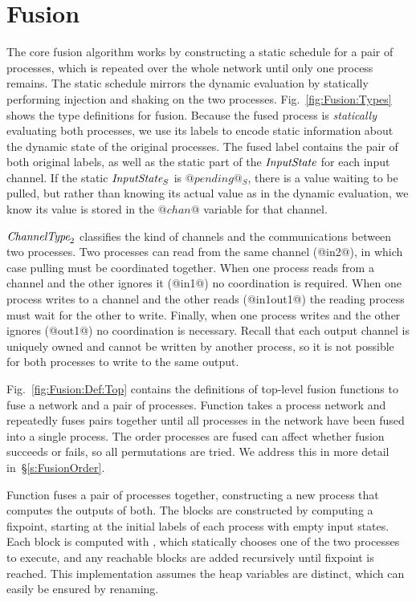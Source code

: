 \section{Fusion}
\label{s:Fusion}




The core fusion algorithm works by constructing a static schedule for a pair of processes, which is repeated over the whole network until only one process remains.
The static schedule mirrors the dynamic evaluation by statically performing injection and shaking on the two processes.
Fig.~\ref{fig:Fusion:Types} shows the type definitions for fusion.
Because the fused process is \emph{statically} evaluating both processes, we use its labels to encode static information about the dynamic state of the original processes.
The fused label contains the pair of both original labels, as well as the static part of the $\textit{InputState}$ for each input channel.
If the static $\textit{InputState}_S$ is $@pending@_S$, there is a value waiting to be pulled, but rather than knowing its actual value as in the dynamic evaluation, we know its value is stored in the $@chan@$ variable for that channel.

$\textit{ChannelType}_2$ classifies the kind of channels and the communications between two processes.
Two processes can read from the same channel (@in2@), in which case pulling must be coordinated together.
When one process reads from a channel and the other ignores it (@in1@) no coordination is required.
When one process writes to a channel and the other reads (@in1out1@) the reading process must wait for the other to write.
Finally, when one process writes and the other ignores (@out1@) no coordination is necessary.
Recall that each output channel is uniquely owned and cannot be written by another process, so it is not possible for both processes to write to the same output.



Fig.~\ref{fig:Fusion:Def:Top} contains the definitions of top-level fusion functions to fuse a network and a pair of processes.
Function  takes a process network and repeatedly fuses pairs together until all processes in the network have been fused into a single process.
The order processes are fused can affect whether fusion succeeds or fails, so all permutations are tried.
We address this in more detail in~\S\ref{s:FusionOrder}.

Function  fuses a pair of processes together, constructing a new process that computes the outputs of both.
The blocks are constructed by computing a fixpoint, starting at the initial labels of each process with empty input states.
Each block is computed with , which statically chooses one of the two processes to execute, and any reachable blocks are added recursively until fixpoint is reached.
This implementation assumes the heap variables are distinct, which can easily be ensured by renaming.

